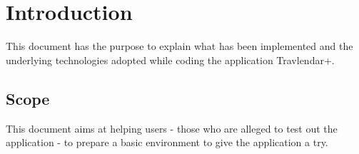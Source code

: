 \chapter{Introduction}
\label{cha:intro}

This document has the purpose to explain what has been implemented and the underlying technologies adopted while coding the application Travlendar+.

\section{Scope}
\label{sec:scope}
This document aims at helping users - those who are alleged to test out the application - to prepare a basic environment to give the application a try.